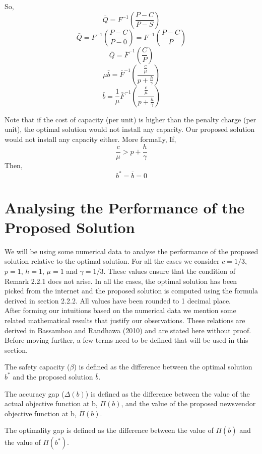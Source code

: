 So, \\
\[\bar{Q}=F^{-1}(\frac{P-C}{P-S})\]
\[\bar{Q}=F^{-1}(\frac{P-C}{P-0})=F^{-1}(\frac{P-C}{P})\]
\[\bar{Q}=\bar{F}^{-1}(\frac{C}{P})\]
\[\mu \bar{b}=\bar{F}^{-1}(\frac{\frac{c}{\mu}}{p + \frac{h}{\gamma}})\]
\[\bar{b}=\frac{1}{\mu}\bar{F}^{-1}(\frac{\frac{c}{\mu}}{p + \frac{h}{\gamma}})\]
\begin{remark}
Note that if the cost of capacity (per unit) is higher than the penalty charge (per unit), the optimal solution would not install any capacity. Our proposed solution would not install any capacity either.
More formally,
If,
\[\frac{c}{\mu}>p + \frac{h}{\gamma}\]
Then,
\[b^*=\bar{b}=0\]
\end{remark}
\section{Analysing the Performance of the Proposed Solution}
We will be using some numerical data to analyse the performance of the proposed solution relative to the optimal solution. For all the cases we consider $c=1/3$, $p=1$, $h=1$, $\mu=1$ and $\gamma=1/3$. These values ensure that the condition of Remark 2.2.1 does not arise. In all the cases, the optimal solution has been picked from the internet and the proposed solution is computed using the formula derived in section 2.2.2. All values have been rounded to 1 decimal place. \\
After forming our intuitions based on the numerical data we mention some related mathematical results that justify our observations. These relations are derived in Bassamboo and Randhawa (2010) \cite{bassamboo} and are stated here without proof. \\
Before moving further, a few terms need to be defined that will be used in this section. 
\begin{definition}\label{}
The safety capacity ($\beta$) is defined as the difference between the optimal solution $b^*$ and the proposed solution $\bar{b}$.
\end{definition}
\begin{definition}\label{}
The accuracy gap ($\Delta(b)$) is defined as the difference between the value of the actual objective function at b, $\Pi(b)$, and the value of the proposed newsvendor objective function at b, $\bar{\Pi}(b)$.
\end{definition}
\begin{definition}\label{}
The optimality gap is defined as the difference between the value of $\Pi(\bar{b})$ and the value of $\Pi(b^*)$.
\end{definition}
